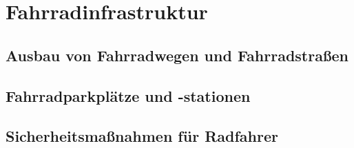 \section{Fahrradinfrastruktur}
\subsection{Ausbau von Fahrradwegen und Fahrradstraßen}
\subsection{Fahrradparkplätze und -stationen}
\subsection{Sicherheitsmaßnahmen für Radfahrer}

